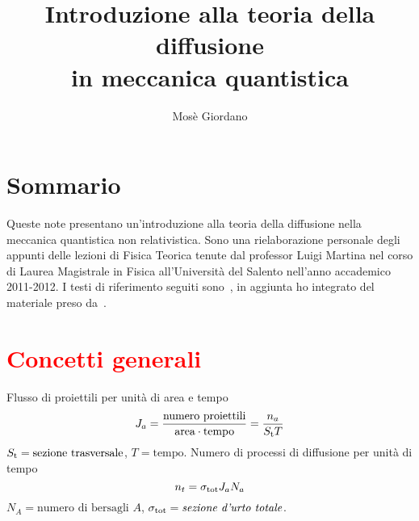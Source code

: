 \documentclass[a4paper,fleqn,twoside,12pt]{article}
\title{Introduzione alla teoria della diffusione \\ in meccanica quantistica}
\author{Mosè Giordano}
\newcommand{\completare}[1]{\textcolor{red}{#1}}
\begin{document}
\maketitle
\tableofcontents

{}
\section*{Sommario}
\label{sec:sommario}

Queste note presentano un'introduzione alla teoria della diffusione nella
meccanica quantistica non relativistica.  Sono una rielaborazione personale
degli appunti delle lezioni di Fisica Teorica tenute dal professor Luigi Martina
nel corso di Laurea Magistrale in Fisica all'Università del Salento nell'anno
accademico 2011-2012.  I testi di riferimento seguiti
sono~\textcites{ballentine:quantum-mechanics,cohen:quantum-mechanics}, in
aggiunta ho integrato del materiale preso
da~\textcite{griffiths:introduction-qm}.

\section{\completare{Concetti generali}}
\label{sec:concetti-generali}

Flusso di proiettili per unità di area e tempo
\begin{equation}
  J_{a} = \frac{\text{numero proiettili}}{\text{area}\cdot\text{tempo}} =
  \frac{n_{a}}{S_{\textup{t}} T}
\end{equation}
$S_{\textup{t}} = \text{sezione trasversale}$, $T = \text{tempo}$.  Numero di
processi di diffusione per unità di tempo
\begin{equation}
  n_{t} = \sigma_{\textup{tot}} J_{a} N_{a}
\end{equation}
$N_{A} = \text{numero di bersagli $A$}$,
$\sigma_{\textup{tot}} = \text{\emph{sezione d'urto totale}}$.
\end{document}
